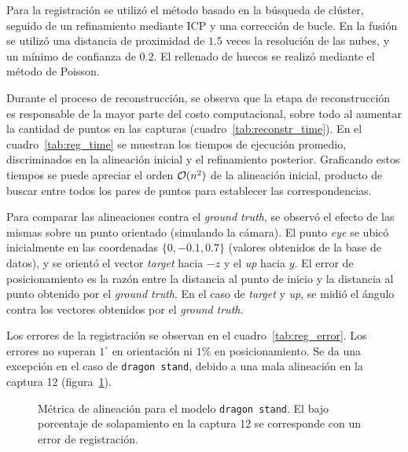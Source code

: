 		Para la registración se utilizó el método basado en la búsqueda de clúster,
		seguido de un refinamiento mediante ICP y una corrección de bucle.
		En la fusión se utilizó una distancia de proximidad de $1.5$ veces la resolución de las nubes,
		y un mínimo de confianza de $0.2$.
		El rellenado de huecos se realizó mediante el método de Poisson.


		Durante el proceso de reconstrucción, se observa que la etapa de reconstrucción
		es responsable de la mayor parte del costo computacional, sobre todo al aumentar
		la cantidad de puntos en las capturas (cuadro~\ref{tab:reconstr_time}).
		En el cuadro~\ref{tab:reg_time} se muestran
		los tiempos de ejecución promedio, discriminados en la alineación
		inicial y el refinamiento posterior.
		Graficando estos tiempos se puede apreciar el orden $\mathcal{O}(n^2)$ de la alineación inicial,
		producto de buscar entre todos los pares de puntos para establecer las correspondencias.
		

		

		Para comparar las alineaciones contra el \emph{ground truth}, se
		observó el efecto de las mismas sobre un punto orientado (simulando la
		cámara). El punto \emph{eye} se ubicó inicialmente en las coordenadas
		$\{0, -0.1, 0.7\}$ (valores obtenidos de la base de datos), y se
		orientó el vector \emph{target} hacia $-z$ y el \emph{up} hacia $y$.
		El error de posicionamiento es la razón entre la distancia al punto
		de inicio y la distancia al punto obtenido por el \emph{ground truth}.
		En el caso de \emph{target} y \emph{up}, se midió el ángulo contra los
		vectores obtenidos por el \emph{ground truth}.

		Los errores de la registración se observan en el
		cuadro~\ref{tab:reg_error}.  Los errores no superan $1^{\circ}$ en
		orientación ni $1\%$ en posicionamiento.  Se da una excepción en el
		caso de \texttt{dragon stand}, debido a una mala alineación en la
		captura 12 (figura~\ref{fig:fitness}).

		

		\begin{figure}
			\centering
			\caption{\label{fig:fitness}Métrica de alineación para el modelo \texttt{dragon stand}. El bajo
			porcentaje de solapamiento en la captura 12 se corresponde
			con un error de registración.}
		\end{figure}



